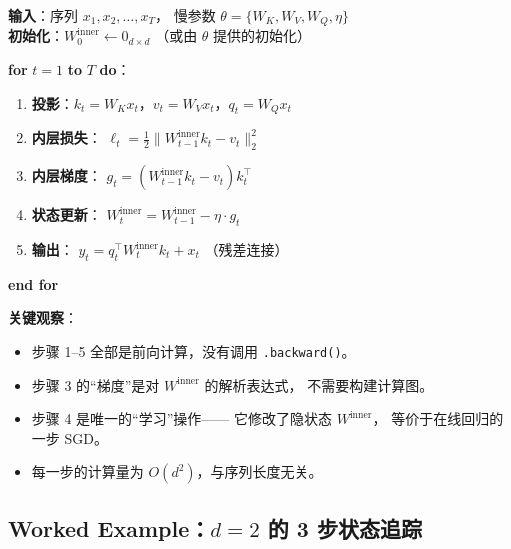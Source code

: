 \begin{algorithm}
\textbf{输入}：序列 $x_1, x_2, \ldots, x_T$，
慢参数 $\theta = \{W_K, W_V, W_Q, \eta\}$ \\
\textbf{初始化}：$W_0^{\text{inner}} \gets 0_{d \times d}$
（或由 $\theta$ 提供的初始化）

\medskip
\textbf{for} $t = 1$ \textbf{to} $T$ \textbf{do}：
\begin{enumerate}
  \item \textbf{投影}：$k_t = W_K x_t$，$v_t = W_V x_t$，$q_t = W_Q x_t$
  \item \textbf{内层损失}：
    $\ell_t = \frac{1}{2}\|W_{t-1}^{\text{inner}} k_t - v_t\|_2^2$
  \item \textbf{内层梯度}：
    $g_t = (W_{t-1}^{\text{inner}} k_t - v_t) k_t^\top$
  \item \textbf{状态更新}：
    $W_t^{\text{inner}} = W_{t-1}^{\text{inner}} - \eta \cdot g_t$
  \item \textbf{输出}：
    $y_t = q_t^\top W_t^{\text{inner}} k_t + x_t$
    （残差连接）
\end{enumerate}
\textbf{end for}
\end{algorithm}

\textbf{关键观察}：
\begin{itemize}
  \item 步骤 1--5 全部是前向计算，没有调用 \texttt{.backward()}。
  \item 步骤 3 的``梯度''是对 $W^{\text{inner}}$ 的解析表达式，
    不需要构建计算图。
  \item 步骤 4 是唯一的``学习''操作——
    它修改了隐状态 $W^{\text{inner}}$，
    等价于在线回归的一步 SGD。
  \item 每一步的计算量为 $O(d^2)$，与序列长度无关。
\end{itemize}

\subsection*{Worked Example：$d=2$ 的 3 步状态追踪}

